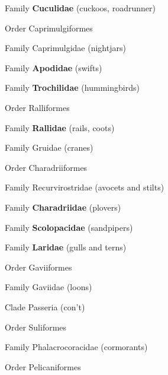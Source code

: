 \documentclass[10pt]{article}
\newlength\mylength
\newcommand*{\growparindent}{\addtolength{\parindent}{\mylength}}
\newcommand*{\reduceparindent}{\addtolength{\parindent}{-1\mylength}}
\begin{document}
\begin{multicols}{2}
\begin{spacing}{1.35}
    	  Family \textbf{Cuculidae} (cuckoos, roadrunner)
    	  
    	\reduceparindent
    	
    	Order Caprimulgiformes
    	
    		\growparindent
    		
    		Family Caprimulgidae (nightjars)
    		
    		Family \textbf{Apodidae} (swifts)
    		
    		Family \textbf{Trochilidae} (hummingbirds)
    		
    	\reduceparindent
    	
    	Order Ralliformes
    	
    	\growparindent
    	
    		Family \textbf{Rallidae} (rails, coots)
    		
    		Family Gruidae (cranes)
    		
    	\reduceparindent
    	
    	Order Charadriiformes
    	
    		\growparindent
    		
    		Family Recurvirostridae (avocets and stilts)
    		
    		Family \textbf{Charadriidae} (plovers)
    		
    		Family \textbf{Scolopacidae} (sandpipers)
    		
    		Family \textbf{Laridae} (gulls and terns)
    		
    	\reduceparindent
    	
    	Order Gaviiformes
    	
    		\growparindent
    		
    		Family Gaviidae (loons)
\columnbreak

	\reduceparindent
	
	\reduceparindent
      
      
    Clade Passeria (con't)
      
      \growparindent
      
      Order Suliformes
      
      	\growparindent
      
      	Family Phalacrocoracidae (cormorants)
      	
      \reduceparindent
      
      Order Pelicaniformes
      
      	\growparindent
      	

\end{spacing}
\end{multicols}
\end{document}
